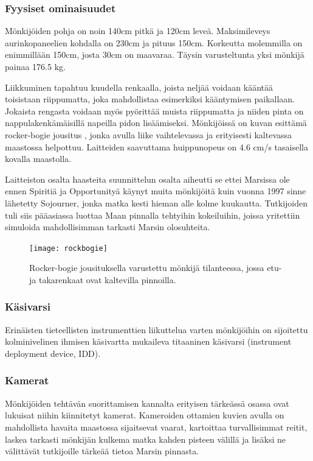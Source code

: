 \documentclass[finnish]{tktltiki2}
\theoremstyle{definition}
\theoremstyle{remark}
\begin{document}
\subsubsection{Fyysiset ominaisuudet}
Mönkijöiden pohja on noin 140cm pitkä ja 120cm leveä. Maksimileveys aurinkopaneelien kohdalla on 230cm ja pituus 150cm. Korkeutta molemmilla on enimmillään 150cm, josta 30cm on maavaraa. Täysin varusteltunta yksi mönkijä painaa 176.5 kg.

Liikkuminen tapahtuu kuudella renkaalla, joista neljää voidaan kääntää toisistaan riippumatta, joka mahdollistaa esimerkiksi kääntymisen paikallaan. Jokaista rengasta voidaan myös pyörittää muista riippumatta ja niiden pinta on nappulakenkämäisillä napeilla pidon lisäämiseksi. Mönkijöissä on kuvan esittämä rocker-bogie jousitus \cite{harrington2004challenges}, jonka avulla liike vaihtelevassa ja erityisesti kaltevassa maastossa helpottuu. Laitteiden saavuttama huippunopeus on 4.6 cm/s tasaisella kovalla maastolla.

Laitteiston osalta haasteita suunnittelun osalta aiheutti se ettei Marsissa ole ennen Spiritiä ja Opportunityä käynyt muita mönkijöitä kuin vuonna 1997 sinne lähetetty Sojourner, jonka matka kesti hieman alle kolme kuukautta. Tutkijoiden tuli siis pääasiassa luottaa Maan pinnalla tehtyihin kokeiluihin, joissa yritettiin simuloida mahdollisimman tarkasti Marsin olosuhteita. \cite{lindemann2006mars}

\begin{figure}[H]
	\centering
		\texttt{[image: rockbogie]}
	\caption{Rocker-bogie jousituksella varustettu mönkijä tilanteessa, jossa etu- ja takarenkaat ovat kaltevilla pinnoilla.\cite{rbogieimage}}
\end{figure}

\subsubsection{Käsivarsi}
Erinäisten tieteellisten instrumenttien liikuttelua varten mönkijöihin on sijoitettu kolminivelinen ihmisen käsivartta mukaileva titaaninen käsivarsi (instrument deployment device, IDD).\cite{roverarm}

\subsubsection{Kamerat}
Mönkijöiden tehtävän suorittamisen kannalta erityisen tärkeässä osassa ovat lukuisat niihin kiinnitetyt kamerat. Kameroiden ottamien kuvien avulla on mahdollista havaita maastossa sijaitsevat vaarat, kartoittaa turvallisimmat reitit, laskea tarkasti mönkijän kulkema matka kahden pisteen välillä ja lisäksi ne välittävät tutkijoille tärkeää tietoa Marsin pinnasta.
\end{document}
